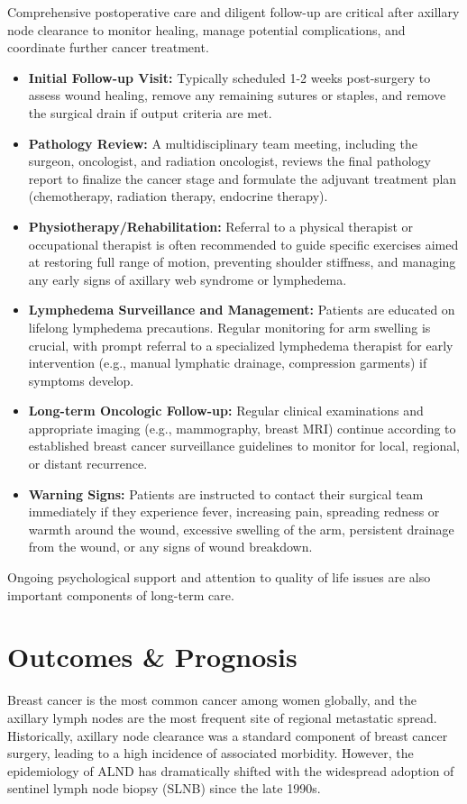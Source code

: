 Comprehensive postoperative care and diligent follow-up are critical after axillary node clearance to monitor healing, manage potential complications, and coordinate further cancer treatment.

\begin{itemize}
  \item \textbf{Initial Follow-up Visit:} Typically scheduled 1-2 weeks post-surgery to assess wound healing, remove any remaining sutures or staples, and remove the surgical drain if output criteria are met.
  \item \textbf{Pathology Review:} A multidisciplinary team meeting, including the surgeon, oncologist, and radiation oncologist, reviews the final pathology report to finalize the cancer stage and formulate the adjuvant treatment plan (chemotherapy, radiation therapy, endocrine therapy).
  \item \textbf{Physiotherapy/Rehabilitation:} Referral to a physical therapist or occupational therapist is often recommended to guide specific exercises aimed at restoring full range of motion, preventing shoulder stiffness, and managing any early signs of axillary web syndrome or lymphedema.
  \item \textbf{Lymphedema Surveillance and Management:} Patients are educated on lifelong lymphedema precautions. Regular monitoring for arm swelling is crucial, with prompt referral to a specialized lymphedema therapist for early intervention (e.g., manual lymphatic drainage, compression garments) if symptoms develop.
  \item \textbf{Long-term Oncologic Follow-up:} Regular clinical examinations and appropriate imaging (e.g., mammography, breast MRI) continue according to established breast cancer surveillance guidelines to monitor for local, regional, or distant recurrence.
  \item \textbf{Warning Signs:} Patients are instructed to contact their surgical team immediately if they experience fever, increasing pain, spreading redness or warmth around the wound, excessive swelling of the arm, persistent drainage from the wound, or any signs of wound breakdown.
\end{itemize}
Ongoing psychological support and attention to quality of life issues are also important components of long-term care.

\section*{Outcomes \& Prognosis}
Breast cancer is the most common cancer among women globally, and the axillary lymph nodes are the most frequent site of regional metastatic spread. Historically, axillary node clearance was a standard component of breast cancer surgery, leading to a high incidence of associated morbidity. However, the epidemiology of ALND has dramatically shifted with the widespread adoption of sentinel lymph node biopsy (SLNB) since the late 1990s.

